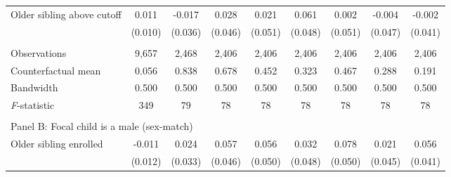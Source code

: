 \begin{table}[!htbp]
{{\begin{tabular}{lcccccccc}
Older sibling above cutoff&       0.011   &      -0.017   &       0.028   &       0.021   &       0.061   &       0.002   &      -0.004   &      -0.002   \\
                    &     (0.010)   &     (0.036)   &     (0.046)   &     (0.051)   &     (0.048)   &     (0.051)   &     (0.047)   &     (0.041)   \\
                    &               &               &               &               &               &               &               &               \\
Observations        &       9,657   &       2,468   &       2,406   &       2,406   &       2,406   &       2,406   &       2,406   &       2,406   \\
Counterfactual mean &       0.056   &       0.838   &       0.678   &       0.452   &       0.323   &       0.467   &       0.288   &       0.191   \\
Bandwidth           &       0.500   &       0.500   &       0.500   &       0.500   &       0.500   &       0.500   &       0.500   &       0.500   \\
\textit{F}-statistic&         349   &          79   &          78   &          78   &          78   &          78   &          78   &          78   \\
 
&  &  &  & & & & & \\
\multicolumn{10}{l}{Panel B: Focal child is a male (sex-match)} \\
Older sibling enrolled&      -0.011   &       0.024   &       0.057   &       0.056   &       0.032   &       0.078   &       0.021   &       0.056   \\
                    &     (0.012)   &     (0.033)   &     (0.046)   &     (0.050)   &     (0.048)   &     (0.050)   &     (0.045)   &     (0.041)   \\
 

\end{tabular}}}
\end{table}
